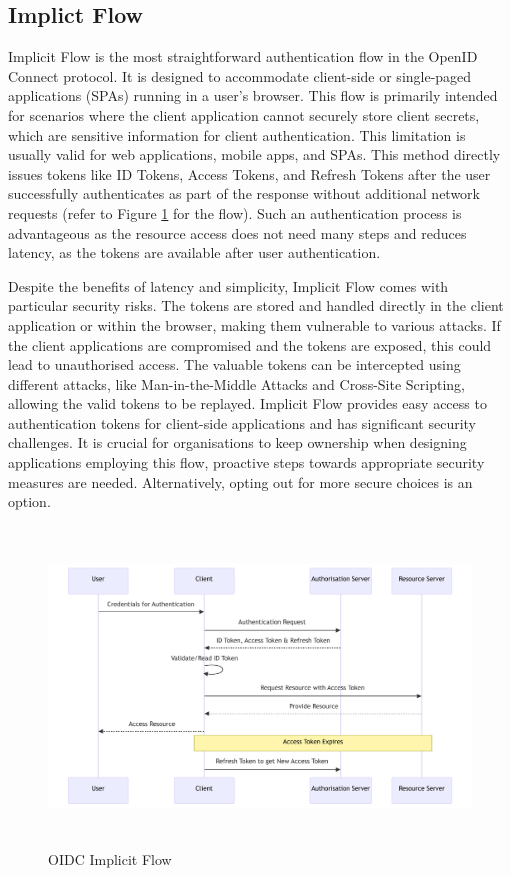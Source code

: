 \subsection{Implict Flow}
Implicit Flow is the most straightforward authentication flow in the OpenID Connect protocol.
It is designed to accommodate client-side or single-paged applications (SPAs) running in a user's browser.
This flow is primarily intended for scenarios where the client application cannot securely store client secrets, which are sensitive information for client authentication.
This limitation is usually valid for web applications, mobile apps, and SPAs.
This method directly issues tokens like ID Tokens, Access Tokens, and Refresh Tokens after the user successfully authenticates as part of the response without additional network requests (refer to Figure \ref{fig:implicit_flow} for the flow).
Such an authentication process is advantageous as the resource access does not need many steps and reduces latency, as the tokens are available after user authentication. 

Despite the benefits of latency and simplicity, Implicit Flow comes with particular security risks.
The tokens are stored and handled directly in the client application or within the browser, making them vulnerable to various attacks.
If the client applications are compromised and the tokens are exposed, this could lead to unauthorised access.
The valuable tokens can be intercepted using different attacks, like Man-in-the-Middle Attacks and Cross-Site Scripting, allowing the valid tokens to be replayed.
Implicit Flow provides easy access to authentication tokens for client-side applications and has significant security challenges.
It is crucial for organisations to keep ownership when designing applications employing this flow, proactive steps towards appropriate security measures are needed. Alternatively, opting out for more secure choices is an option.

\begin{figure}[h!]
\centering
\label{fig:implicit_flow}
\includegraphics[width=\textwidth, height=320px]{pics/implicit_flow.pdf}
\caption{OIDC Implicit Flow}
\end{figure}

